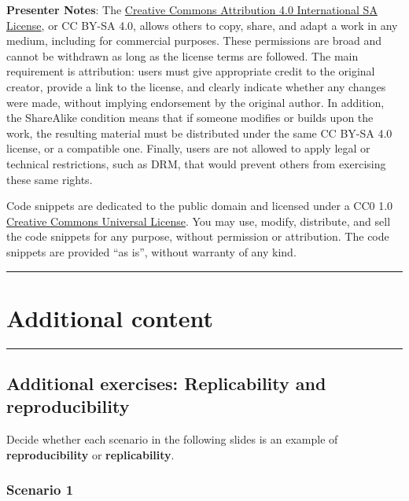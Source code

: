 \documentclass[
  english,
  letterpaper,
  DIV=11,
  numbers=noendperiod]{scrartcl}
\begin{document}
\textbf{Presenter Notes}: The
\href{https://creativecommons.org/licenses/by-sa/4.0/deed.en}{Creative
Commons Attribution 4.0 International SA License}, or CC BY-SA 4.0,
allows others to copy, share, and adapt a work in any medium, including
for commercial purposes. These permissions are broad and cannot be
withdrawn as long as the license terms are followed. The main
requirement is attribution: users must give appropriate credit to the
original creator, provide a link to the license, and clearly indicate
whether any changes were made, without implying endorsement by the
original author. In addition, the ShareAlike condition means that if
someone modifies or builds upon the work, the resulting material must be
distributed under the same CC BY-SA 4.0 license, or a compatible one.
Finally, users are not allowed to apply legal or technical restrictions,
such as DRM, that would prevent others from exercising these same
rights.

Code snippets are dedicated to the public domain and licensed under a
CC0 1.0
\href{https://creativecommons.org/publicdomain/zero/1.0/}{Creative
Commons Universal License}. You may use, modify, distribute, and sell
the code snippets for any purpose, without permission or attribution.
The code snippets are provided ``as is'', without warranty of any kind.

\begin{center}\rule{0.5\linewidth}{0.5pt}\end{center}

\section{Additional content}\label{additional-content}

\begin{center}\rule{0.5\linewidth}{0.5pt}\end{center}

\subsection{Additional exercises: Replicability and
reproducibility}\label{additional-exercises-replicability-and-reproducibility}

Decide whether each scenario in the following slides is an example of
\textbf{reproducibility} or \textbf{replicability}.

\subsubsection{Scenario 1}
\end{document}
